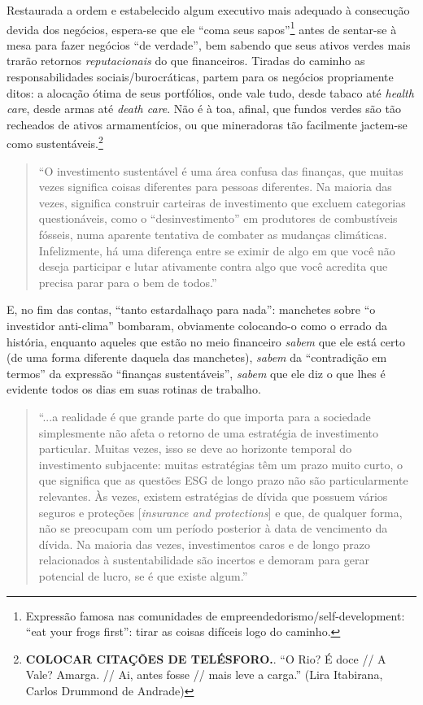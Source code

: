 \documentclass[12pt]{article}
\begin{document}
Restaurada a ordem e estabelecido algum executivo mais adequado à consecução devida dos negócios, espera-se que ele “coma seus sapos”\footnote{Expressão famosa nas comunidades de empreendedorismo/self-development: “eat your frogs first”: tirar as coisas difíceis logo do caminho.} antes de sentar-se à mesa para fazer negócios “de verdade”, bem sabendo que seus ativos verdes mais trarão retornos \textit{reputacionais} do que financeiros. Tiradas do caminho as responsabilidades sociais/burocráticas, partem para os negócios propriamente ditos: a alocação ótima de seus portfólios, onde vale tudo, desde tabaco até \textit{health care}, desde armas até \textit{death care}. Não é à toa, afinal, que fundos verdes são tão recheados de ativos armamentícios, ou que mineradoras tão facilmente jactem-se como sustentáveis.\footnote{\textbf{COLOCAR CITAÇÕES DE TELÉSFORO.}. “O Rio? É doce // A Vale? Amarga. // Ai, antes fosse // mais leve a carga.” (Lira Itabirana, Carlos Drummond de Andrade)}

\begin{quote}
    ``O investimento sustentável é uma área confusa das finanças, que muitas vezes significa coisas diferentes para pessoas diferentes. Na maioria das vezes, significa construir carteiras de investimento que excluem categorias questionáveis, como o ``desinvestimento'' em produtores de combustíveis fósseis, numa aparente tentativa de combater as mudanças climáticas. Infelizmente, há uma diferença entre se eximir de algo em que você não deseja participar e lutar ativamente contra algo que você acredita que precisa parar para o bem de todos.'' \cite[p. 9]{Fancy2021}
\end{quote}

E, no fim das contas, ``tanto estardalhaço para nada'': manchetes sobre ``o investidor anti-clima'' bombaram, obviamente colocando-o como o errado da história, enquanto aqueles que estão no meio financeiro \textit{sabem} que ele está certo (de uma forma diferente daquela das manchetes), \textit{sabem} da ``contradição em termos'' da expressão ``finanças sustentáveis'', \textit{sabem} que ele diz o que lhes é evidente todos os dias em suas rotinas de trabalho.
\begin{quote}
    ``...a realidade é que grande parte do que importa para a sociedade simplesmente não afeta o retorno de uma estratégia de investimento particular. Muitas vezes, isso se deve ao horizonte temporal do investimento subjacente: muitas estratégias têm um prazo muito curto, o que significa que as questões ESG de longo prazo não são particularmente relevantes. Às vezes, existem estratégias de dívida que possuem vários seguros e proteções [\textit{insurance and protections}] e que, de qualquer forma, não se preocupam com um período posterior à data de vencimento da dívida. Na maioria das vezes, investimentos caros e de longo prazo relacionados à sustentabilidade são incertos e demoram para gerar potencial de lucro, se é que existe algum.'' \cite[p. 15]{Fancy2021}
\end{quote}
\end{document}
